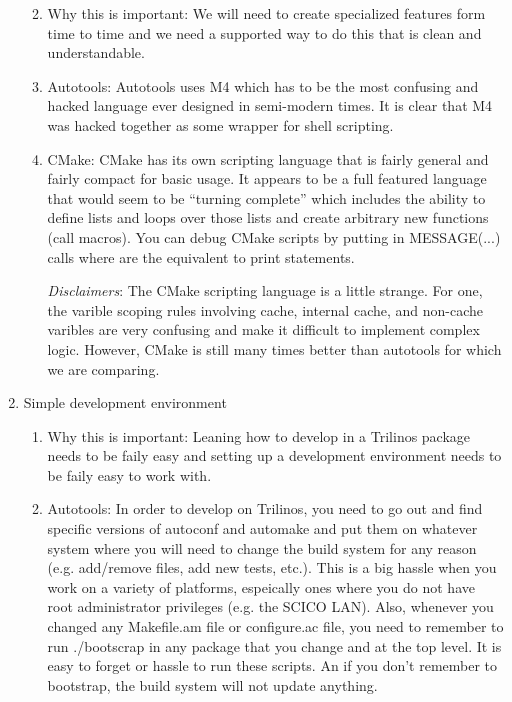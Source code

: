 \documentclass[pdf,ps2pdf,11pt]{SANDreport}
\begin{document}
\begin{enumerate}
  \begin{enumerate}

  {}\item Why this is important: We will need to create specialized
  features form time to time and we need a supported way to do this
  that is clean and understandable.

  {}\item Autotools: Autotools uses M4 which has to be the most
  confusing and hacked language ever designed in semi-modern times.
  It is clear that M4 was hacked together as some wrapper for shell
  scripting.

  {}\item CMake: CMake has its own scripting language that is fairly
  general and fairly compact for basic usage.  It appears to be a full
  featured language that would seem to be ``turning complete'' which
  includes the ability to define lists and loops over those lists and
  create arbitrary new functions (call macros).  You can debug CMake
  scripts by putting in MESSAGE(...) calls where are the equivalent to
  print statements.

  {}\textit{Disclaimers}: The CMake scripting language is a little
  strange.  For one, the varible scoping rules involving cache,
  internal cache, and non-cache varibles are very confusing and make
  it difficult to implement complex logic.  However, CMake is still
  many times better than autotools for which we are comparing.

  \end{enumerate}

{}\item Simple development environment

  \begin{enumerate}

  {}\item Why this is important: Leaning how to develop in a Trilinos
  package needs to be faily easy and setting up a development
  environment needs to be faily easy to work with.

  {}\item Autotools: In order to develop on Trilinos, you need to go
  out and find specific versions of autoconf and automake and put them
  on whatever system where you will need to change the build system
  for any reason (e.g. add/remove files, add new tests, etc.).  This
  is a big hassle when you work on a variety of platforms, espeically
  ones where you do not have root administrator privileges (e.g. the
  SCICO LAN).  Also, whenever you changed any Makefile.am file or
  configure.ac file, you need to remember to run ./bootscrap in any
  package that you change and at the top level.  It is easy to forget
  or hassle to run these scripts.  An if you don't remember to
  bootstrap, the build system will not update anything.


\end{enumerate}
\end{enumerate}
\end{document}
